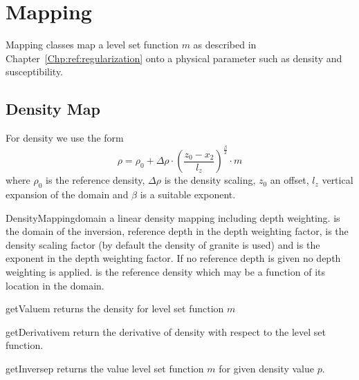 \chapter{Mapping}\label{Chp:ref:mapping}

Mapping classes map a level set function $m$ as described in Chapter~\ref{Chp:ref:regularization}
onto a physical parameter such as density and susceptibility. 

\section{Density Map}\label{Chp:ref:mapping density}
For density we use the form 
\begin{equation}\label{EQU:MAP:1}
\rho =  \rho_{0} + \Delta \rho \cdot \left( \frac{z_0-x_2}{l_z} \right)^{\frac{\beta}{2}}  \cdot m 
\end{equation}  
where $\rho_{0}$ is the reference density, $\Delta \rho$ is the density scaling, $z_0$ an offset, $l_z$ vertical expansion
of the domain and $\beta$ is a suitable exponent. 

\begin{classdesc}{DensityMapping}{domain
        }
a linear density mapping including depth weighting.  is the
domain of the inversion,  reference depth in the depth weighting
factor,  is the density scaling factor (by default the density of
granite is used) and  is the exponent in the depth weighting factor.
If no reference depth  is given no depth weighting is applied.
 is the reference density which may be a function of its location
in the domain. 
\end{classdesc}

\begin{methoddesc}[DensityMapping]{getValue}{m}
returns the density for level set function $m$
\end{methoddesc}

\begin{methoddesc}[DensityMapping]{getDerivative}{m}
return the derivative of density  with respect to the level set function.
\end{methoddesc}  

\begin{methoddesc}[DensityMapping]{getInverse}{p}
returns the value level set function $m$ for given density value $p$.
\end{methoddesc}



